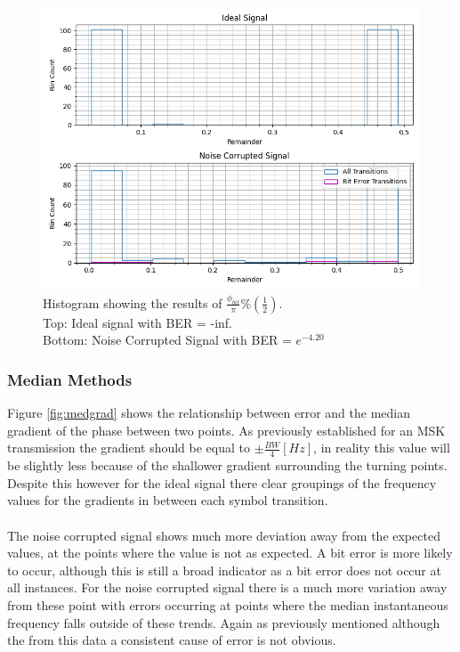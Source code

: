 \begin{figure}[h!]
    \centering
    \includegraphics[width = \textwidth]{figs/error/phaseHist.png}
    \caption{\centering Histogram showing the results of $\frac{\phi_{bit}}{\pi} \%\left(\frac{1}{2}\right)$. \\ Top: Ideal signal with BER = -inf. \\ Bottom: Noise Corrupted Signal with BER = $e^{-4.20}$}
    \label{fig:phaseHist}
\end{figure}

\pagebreak
\subsubsection{Median Methods}
Figure \ref{fig:medgrad} shows the relationship between error and the median gradient of the phase between two points. As previously established for an MSK transmission the gradient should be equal to $\pm\frac{BW}{4}[Hz]$, in reality this value will be slightly less because of the shallower gradient surrounding the turning points. Despite this however for the ideal signal there clear groupings of the frequency values for the gradients in between each symbol transition.
\\\\
The noise corrupted signal shows much more deviation away from the expected values, at the points where the value is not as expected. A bit error is more likely to occur, although this is still a broad indicator as a bit error does not occur at all instances. For the noise corrupted signal there is a much more variation away from these point with errors occurring at points where the median instantaneous frequency falls outside of these trends. Again as previously mentioned although the from this data a consistent cause of error is not obvious.

